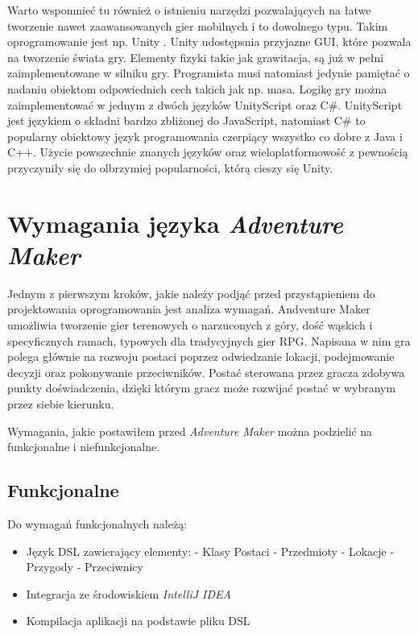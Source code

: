 \documentclass[openright]{xmgr}
\begin{document}
Warto wspomnieć tu również o istnieniu narzędzi pozwalających na łatwe tworzenie nawet zaawansowanych gier mobilnych i to dowolnego typu. Takim oprogramowanie jest np. Unity \cite{Unity3D:2017:Doc}. Unity udostępsnia przyjazne GUI, które pozwala na tworzenie świata gry. Elementy fizyki takie jak grawitacja, są już w pełni zaimplementowane w silniku gry. Programista musi natomiast jedynie pamiętać o nadaniu obiektom odpowiednich cech takich jak np. masa. Logikę gry można zaimplementować w jednym z dwóch języków UnityScript oraz C\#. UnityScript jest językiem o składni bardzo zbliżonej do JavaScript, natomiast C\# to popularny obiektowy język programowania czerpiący wszystko co dobre z Java i C++. Użycie powszechnie znanych języków oraz wieloplatformowość z pewnością przyczyniły się do olbrzymiej popularności, którą cieszy się Unity.


\chapter{Wymagania języka \textit{Adventure Maker}}

Jednym z pierwszym kroków, jakie należy podjąć przed przystąpieniem do projektowania oprogramowania jest analiza wymagań. Andventure Maker umożliwia tworzenie gier terenowych o narzuconych z góry, dość wąskich i specyficznych ramach, typowych dla tradycyjnych gier RPG. Napisana w nim gra polega głównie na rozwoju postaci poprzez odwiedzanie lokacji, podejmowanie decyzji oraz pokonywanie przeciwników. Postać sterowana przez gracza zdobywa punkty doświadczenia, dzięki którym gracz może rozwijać postać w wybranym przez siebie kierunku. 

Wymagania, jakie postawiłem przed \textit{Adventure Maker} można podzielić na funkcjonalne i niefunkcjonalne.

\section{Funkcjonalne}
Do wymagań funkcjonalnych należą:
\begin{itemize}
\item Język DSL zawierający elementy:
\subitem - Klasy Postaci
\subitem - Przedmioty
\subitem - Lokacje
\subitem - Przygody
\subitem - Przeciwnicy
\item Integracja ze środowiskiem \textit{IntelliJ IDEA}
\item Kompilacja aplikacji na podstawie pliku DSL 
\end{itemize}
\end{document}
